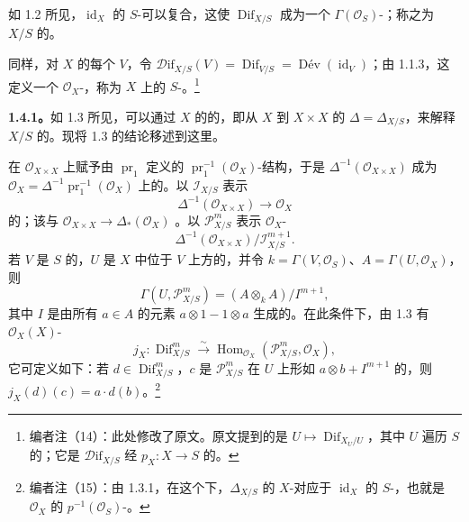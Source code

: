 如 1.2 所见，$\operatorname{id}_X$ 的 $S$-可以复合，这使 $\operatorname{Dif}_{X/S}$ 成为一个 $\Gamma(\mathcal O_S)$-；称之为 $X/S$ 的。

同样，对 $X$ 的每个 $V$，令 $\mathscr{D}\mathrm{if}_{X/S}(V)=\operatorname{Dif}_{V/S}=\operatorname{D\text{é}v}(\operatorname{id}_V)$；由 1.1.3，这定义一个 $\mathcal O_X$-，称为 $X$ 上的 $S$-。\footnote{编者注（14）：此处修改了原文。原文提到的是 $U\mapsto\operatorname{Dif}_{X_U/U}$，其中 $U$ 遍历 $S$ 的；它是 $\mathscr{D}\mathrm{if}_{X/S}$ 经 $p_X:X\to S$ 的。}

\textbf{1.4.1。}如 1.3 所见，可以通过 $X$ 的的，即从 $X$ 到 $X\times X$ 的 $\Delta=\Delta_{X/S}$，来解释 $X/S$ 的。现将 1.3 的结论移述到这里。

在 $\mathcal O_{X\times X}$ 上赋予由 $\operatorname{pr}_1$ 定义的 $\operatorname{pr}_1^{-1}(\mathcal O_X)$-结构，于是 $\Delta^{-1}(\mathcal O_{X\times X})$ 成为 $\mathcal O_X=\Delta^{-1}\operatorname{pr}_1^{-1}(\mathcal O_X)$ 上的。以 $\mathcal I_{X/S}$ 表示
\[
\Delta^{-1}(\mathcal O_{X\times X})\longrightarrow\mathcal O_X
\]
的；该与 $\mathcal O_{X\times X}\to\Delta_*(\mathcal O_X)$ 。以 $\mathcal P_{X/S}^m$ 表示 $\mathcal O_X$-
\[
\Delta^{-1}(\mathcal O_{X\times X})/\mathcal I_{X/S}^{m+1}.
\]
若 $V$ 是 $S$ 的，$U$ 是 $X$ 中位于 $V$ 上方的，并令 $k=\Gamma(V,\mathcal O_S)$、$A=\Gamma(U,\mathcal O_X)$，则
\[
\Gamma(U,\mathcal P_{X/S}^m)=(A\otimes_k A)/I^{m+1},
\]
其中 $I$ 是由所有 $a\in A$ 的元素 $a\otimes1-1\otimes a$ 生成的。在此条件下，由 1.3 有 $\mathcal O_X(X)$-
\[
j_X:\operatorname{Dif}_{X/S}^m\xrightarrow{\sim}\operatorname{Hom}_{\mathcal O_X}(\mathcal P_{X/S}^m,\mathcal O_X),
\]
它可定义如下：若 $d\in\operatorname{Dif}_{X/S}^m$，$c$ 是 $\mathcal P_{X/S}^m$ 在 $U$ 上形如 $a\otimes b+I^{m+1}$ 的，则 $j_X(d)(c)=a\cdot d(b)$。\footnote{编者注（15）：由 1.3.1，在这个下，$\Delta_{X/S}$ 的 $X$-对应于 $\operatorname{id}_X$ 的 $S$-，也就是 $\mathcal O_X$ 的 $p^{-1}(\mathcal O_S)$-。}

